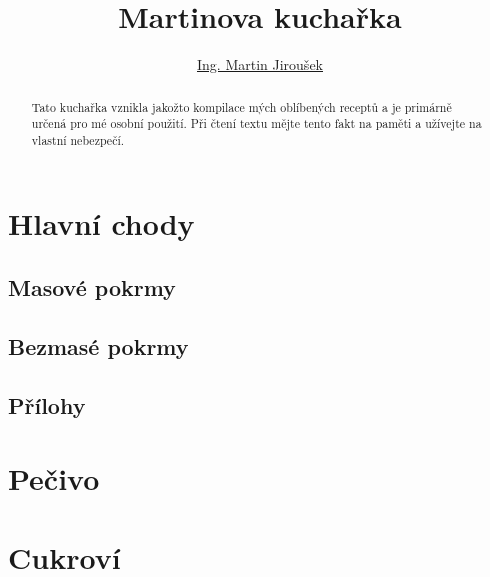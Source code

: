 \documentclass[%
a4paper,
11pt
]{article}
\begin{document}
\title{Martinova kuchařka}
\author{\href{martin.luther.jirousek@gmail.com}{Ing. Martin Jiroušek}}
\maketitle

\begin{abstract}
	Tato kuchařka vznikla jakožto kompilace mých oblíbených receptů a je primárně určená pro mé osobní použití. Při čtení textu mějte tento fakt na paměti a užívejte na vlastní nebezpečí.
\end{abstract}

\tableofcontents

\vspace{5em}


%

\section{Hlavní chody}
\subsection{Masové pokrmy}




\subsection{Bezmasé pokrmy}



\subsection{Přílohy}


\section{Pečivo}


\section{Cukroví}

\end{document}
